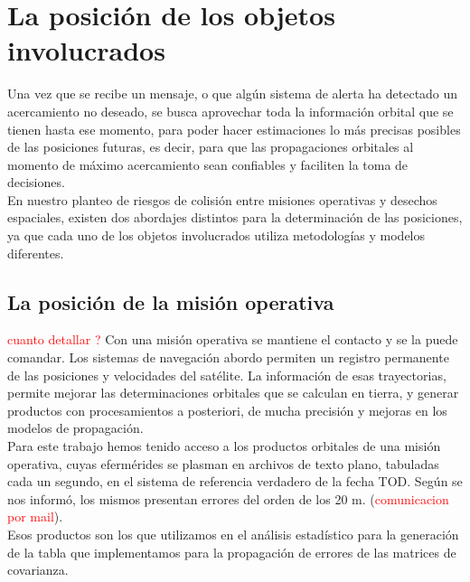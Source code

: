 \section{La posici\'on de los objetos involucrados}{\label{sec:posMision}}

Una vez que se recibe un mensaje, o que alg\'un sistema de alerta ha detectado un acercamiento no deseado, se busca aprovechar toda la informaci\'on orbital que se tienen hasta ese momento, para poder hacer estimaciones lo m\'as precisas posibles de las posiciones futuras, es decir, para que las propagaciones orbitales al momento de m\'aximo acercamiento sean confiables y faciliten la toma de decisiones.\\
En nuestro planteo de riesgos de colisi\'on entre misiones operativas y desechos espaciales, existen dos abordajes distintos para la determinaci\'on de las posiciones, ya que cada uno de los objetos involucrados utiliza metodolog\'ias y modelos diferentes.

\subsection*{La posici\'on de la misi\'on operativa}
\textcolor{red}{cuanto detallar ?}
Con una misi\'on operativa se mantiene el contacto y se la puede comandar. Los sistemas de navegaci\'on abordo permiten un registro permanente de las posiciones y velocidades del sat\'elite. La informaci\'on de esas trayectorias, permite mejorar las determinaciones orbitales que se calculan en tierra, y generar productos con procesamientos a posteriori, de mucha precisi\'on y mejoras en los modelos de propagaci\'on.\\
Para este trabajo hemos tenido acceso a los productos orbitales de una misi\'on operativa, cuyas eferm\'erides se plasman en archivos de texto plano, tabuladas cada un segundo, en el sistema de referencia verdadero de la fecha TOD. Seg\'un se nos inform\'o, los mismos presentan errores del orden de los 20 m. (\textcolor{red}{comunicacion por mail}).\\
Esos productos son los que utilizamos en el an\'alisis estad\'istico para la generaci\'on de la tabla que implementamos para la propagaci\'on de errores de las matrices de covarianza.\\

